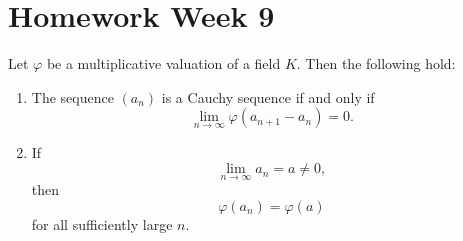 \section{Homework Week 9}

\begin{exercise}
    Let $\varphi$ be a multiplicative valuation of a field $K$. Then the following hold:
    \begin{enumerate}
        \item The sequence $(a_n)$ is a Cauchy sequence if and only if
        \[
            \lim_{n\to\infty}\varphi(a_{n+1}-a_n)=0.
        \]
    
        \item If
        \[
            \lim_{n\to\infty}a_n=a\neq 0,
        \]
        then
        \[
            \varphi(a_n)=\varphi(a)
        \]
        for all sufficiently large $n$.
    \end{enumerate}
    \end{exercise}

